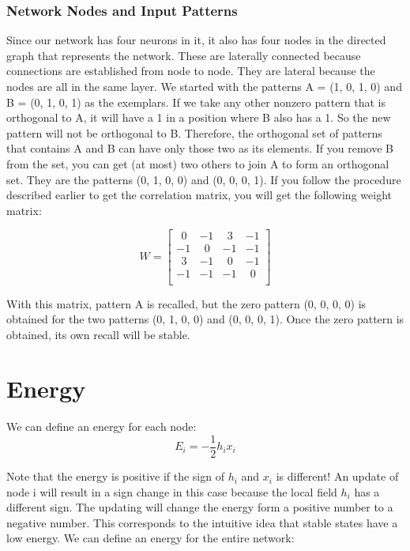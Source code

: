 \documentclass[12pt, right open]{memoir}
\newcommand{\matplus}
{
~~
}
\begin{document}
\subsubsection{Network Nodes and Input Patterns}
Since our network has four neurons in it, it also has four nodes in the directed
graph that represents the network. These are laterally connected because
connections are established from node to node. They are lateral because the
nodes are all in the same layer. We started with the patterns A = (1, 0, 1, 0)
and B = (0, 1, 0, 1) as the exemplars. If we take any other nonzero pattern that
is orthogonal to A, it will have a 1 in a position where B also has a 1. So the
new pattern will not be orthogonal to B. Therefore, the orthogonal set of
patterns that contains A and B can have only those two as its elements. If you
remove B from the set, you can get (at most) two others to join A to form an
orthogonal set. They are the patterns (0, 1, 0, 0) and (0, 0, 0, 1).
If you follow the procedure described earlier to get the correlation matrix, you
will get the following weight matrix:


\[ 
W = \begin{bmatrix}
 \matplus0 & -1         &  \matplus3 & -1 \\
  -1       &  \matplus0 &  -1        &  -1 \\
 \matplus3 & -1         &  \matplus0 & -1 \\
-1         &  -1        & -1         &  \matplus0 \\
\end{bmatrix}
\]

With this matrix, pattern A is recalled, but the zero pattern (0, 0, 0, 0) is
obtained for the two patterns (0, 1, 0, 0) and (0, 0, 0, 1). Once the zero pattern
is obtained, its own recall will be stable.

\section{Energy}
We can define an energy for each node:
\[
E_i = - \frac{1}{2}h_ix_i
\]

Note that the energy is positive if the sign of $h_i$ and $x_i$
is different! An update of node i will result in a sign change in this case because the local field $h_i$ has a different sign. The updating will change the energy form a positive number
to a negative number. This corresponds to the intuitive idea that stable states
have a low energy. We can define an energy for the entire network:
\end{document}
